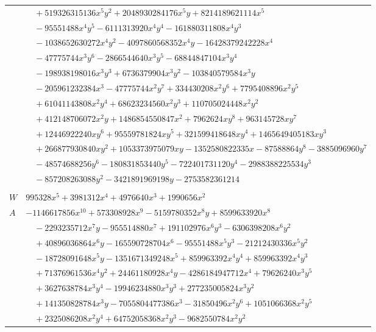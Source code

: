 \documentclass[11pt]{article}
\begin{document}
\begin{longtable}{@{}ll@{}}
 & $\quad +519326315136x^{5}y^{2}+2048930284176x^{5}y+8214189621114x^{5}$\\
 & $\quad -95551488x^{4}y^{5}-6111313920x^{4}y^{4}-161880311808x^{4}y^{3}$\\
 & $\quad -1038652630272x^{4}y^{2}-4097860568352x^{4}y-16428379242228x^{4}$\\
 & $\quad -47775744x^{3}y^{6}-2866544640x^{3}y^{5}-68844847104x^{3}y^{4}$\\
 & $\quad -198938198016x^{3}y^{3}+6736379904x^{3}y^{2}-103840579584x^{3}y$\\
 & $\quad -205961232384x^{3}-47775744x^{2}y^{7}+334430208x^{2}y^{6}+7795408896x^{2}y^{5}$\\
 & $\quad +61041143808x^{2}y^{4}+68623234560x^{2}y^{3}+110705024448x^{2}y^{2}$\\
 & $\quad +412148706072x^{2}y+1486854550847x^{2}+7962624xy^{8}+963145728xy^{7}$\\
 & $\quad +12446922240xy^{6}+95559781824xy^{5}+321599418648xy^{4}+1465649405183xy^{3}$\\
 & $\quad +266877930840xy^{2}+1053373975079xy-1352580822335x-87588864y^{8}-3885096960y^{7}$\\
 & $\quad -48574688256y^{6}-180831853440y^{5}-722401731120y^{4}-2988388225534y^{3}$\\
 & $\quad -857208263088y^{2}-3421891969198y-2753582361214$\\
\addlinespace[3pt]
\multicolumn{2}{@{}l}{$i=70$, $m=41472$, neighbours $112,34,50,60,64,67,68,104$}\\
$W$ & $995328x^{5}+3981312x^{4}+4976640x^{3}+1990656x^{2}$\\
$A$ & $-1146617856x^{10}+573308928x^{9}-5159780352x^{8}y+8599633920x^{8}$\\
 & $\quad -2293235712x^{7}y-955514880x^{7}+191102976x^{6}y^{3}-6306398208x^{6}y^{2}$\\
 & $\quad +40896036864x^{6}y-165590728704x^{6}-95551488x^{5}y^{3}-21212430336x^{5}y^{2}$\\
 & $\quad -18728091648x^{5}y-1351671349248x^{5}+859963392x^{4}y^{4}+859963392x^{4}y^{3}$\\
 & $\quad +71376961536x^{4}y^{2}+24461180928x^{4}y-4286184947712x^{4}+79626240x^{3}y^{5}$\\
 & $\quad +3627638784x^{3}y^{4}-19946234880x^{3}y^{3}+277235005824x^{3}y^{2}$\\
 & $\quad +141350828784x^{3}y-7055804477386x^{3}-31850496x^{2}y^{6}+1051066368x^{2}y^{5}$\\
 & $\quad +2325086208x^{2}y^{4}+64752058368x^{2}y^{3}-9682550784x^{2}y^{2}$\\

\end{longtable}
\end{document}
